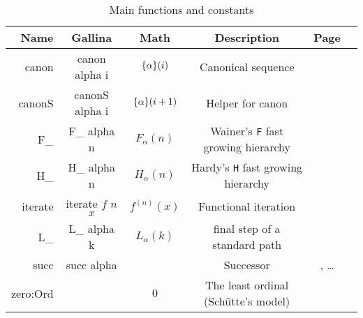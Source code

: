 \documentclass[a4paper]{book}
\begin{document}
\begin{table}[H]
  \centering
  \begin{threeparttable}
    \caption{Main functions and constants}
\begin{tabular}{|r | c|c|c|c|l|}
\hline
Name & Gallina & Math & Description & Page \\ \hline
canon & canon alpha i & $\mbox{$\{\alpha\}(i)$}$& Canonical sequence & \pageref{Functions:canon}\\
canonS & canonS alpha i & $\mbox{$\{\alpha\}(i+1)$}$& Helper for canon & \pageref{Functions:canonS}\\
F\_ & F\_ alpha n & $F_\alpha(n)$ & Wainer's \texttt{F} fast growing hierarchy & \pageref{Functions:F-alpha} \\
H\_ & H\_ alpha n & $H_\alpha(n)$ & Hardy's \texttt{H} fast growing hierarchy & \pageref{Functions:H-alpha} \\
iterate & iterate $f$ $n$ $x$ & $f^{(n)}(x)$ & Functional iteration & \pageref{Functions:iterate} \\
L\_ & L\_ alpha k & $L_\alpha(k)$ & final step of a standard path & \pageref{Functions:L-alpha} \\
succ & succ alpha & & Successor & \pageref{Functions:succ-T1}, \pageref{Functions:succ-sch} \dots \\
zero:Ord & & $0$ & The least ordinal (Schütte's model) & \pageref{Constants:zero:Ord} \\


\hline
\end{tabular}
\end{threeparttable}
\end{table}
\end{document}
